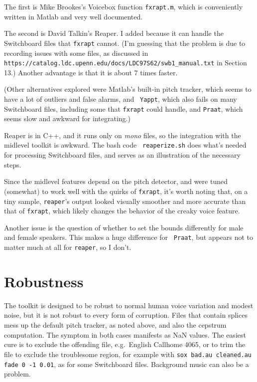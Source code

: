 \documentclass[11pt]{article}
\begin{document}
The first is Mike Brookes's Voicebox function {\tt fxrapt.m}, which is
conveniently written in Matlab and very well documented.

The second is David Talkin's Reaper.  I added because it can handle
the Switchboard files that {\tt fxrapt} cannot.  (I'm guessing that
the problem is due to recording issues with some files, as discussed
in {\tt https://catalog.ldc.upenn.edu/docs/LDC97S62/swb1\_manual.txt}
in Section 13.)  Another advantage is that it is about 7 times faster.

(Other alternatives explored were Matlab's built-in pitch tracker,
which seems to have a lot of outliers and false alarms, and {\tt
  Yappt}, which also fails on many Switchboard files, including some
that {\tt fxrapt} could handle, and {\tt Praat}, which seems slow and
awkward for integrating.)

Reaper is in C++, and it runs only on {\it mono} files, so the
integration with the midlevel toolkit is awkward. The bash code {\tt
  reaperize.sh} does what's needed for processing Switchboard files,
and serves as an illustration of the necessary steps.

Since the midlevel features depend on the pitch detector, and were
tuned (somewhat) to work well with the quirks of {\tt fxrapt}, it's
worth noting that, on a tiny sample, {\tt reaper}'s output looked
visually smoother and more accurate than that of {\tt fxrapt}, which
likely  changes the behavior of the creaky voice feature.

Another issue is the question of whether to set the bounds differently
for male and female speakers.  This makes a huge difference for {\tt
  Praat}, but appears not to matter much at all for {\tt reaper}, so I
don't.


\section{Robustness}           \label{sec:robustness}

The toolkit is designed to be robust to normal human voice variation
and modest noise, but it is not robust to every form of
corruption. Files that contain splices mess up the default pitch
tracker, as noted above, and also the cepstrum computation.  The
symptom in both cases manifests as NaN values.  The easiest cure is to
exclude the offending file, e.g.\ English Callhome 4065, or to trim the
file to exclude the troublesome region, for example with {\tt sox
  bad.au cleaned.au fade 0 -1 0.01}, as for some Switchboard files.
Background music can also be a problem.
\end{document}
